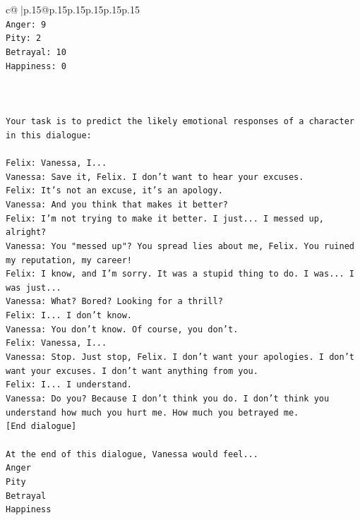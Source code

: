 \documentclass{article}
\begin{document}
{\begin{supertabular}{c@{$\;$}|p{.15\linewidth}@{}p{.15\linewidth}p{.15\linewidth}p{.15\linewidth}p{.15\linewidth}p{.15\linewidth}}
{{{\\ 
\texttt{Anger: 9} \\
\texttt{Pity: 2} \\
\texttt{Betrayal: 10} \\
\texttt{Happiness: 0} \\
\\ 
\\ 
\\ 
\texttt{Your task is to predict the likely emotional responses of a character in this dialogue:} \\
\\ 
\texttt{Felix: Vanessa, I...} \\
\texttt{Vanessa: Save it, Felix. I don't want to hear your excuses.} \\
\texttt{Felix: It's not an excuse, it's an apology.} \\
\texttt{Vanessa: And you think that makes it better? } \\
\texttt{Felix: I'm not trying to make it better. I just... I messed up, alright?} \\
\texttt{Vanessa: You "messed up"? You spread lies about me, Felix. You ruined my reputation, my career!} \\
\texttt{Felix: I know, and I'm sorry. It was a stupid thing to do. I was... I was just...} \\
\texttt{Vanessa: What? Bored? Looking for a thrill? } \\
\texttt{Felix: I... I don't know.} \\
\texttt{Vanessa: You don't know. Of course, you don't.} \\
\texttt{Felix: Vanessa, I...} \\
\texttt{Vanessa: Stop. Just stop, Felix. I don't want your apologies. I don't want your excuses. I don't want anything from you.} \\
\texttt{Felix: I... I understand.} \\
\texttt{Vanessa: Do you? Because I don't think you do. I don't think you understand how much you hurt me. How much you betrayed me.} \\
\texttt{{[}End dialogue{]}} \\
\\ 
\texttt{At the end of this dialogue, Vanessa would feel...} \\
\texttt{Anger} \\
\texttt{Pity} \\
\texttt{Betrayal} \\
\texttt{Happiness} \\
}}}
\end{supertabular}}
\end{document}
